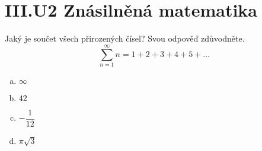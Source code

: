 \documentclass{../../../../style/mkimain}
\begin{document}
\section*{III.U2 Znásilněná matematika}
\noindent Jaký je součet všech přirozených čísel? Svou odpověď zdůvodněte.
$$
\sum_{n=1}^{\infty}n=1+2+3+4+5+\dots
$$
\begin{enumerate}[a)]
    \item $\infty$
    \item $42$
    \item $-\dfrac{1}{12}$
    \item $\pi\sqrt{3}$
\end{enumerate}
\end{document}
